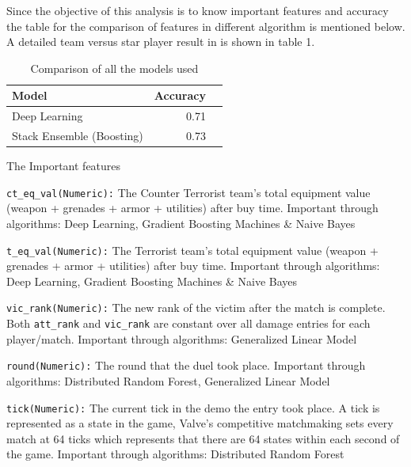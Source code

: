 \documentclass[conference]{IEEEtran}
\begin{document}
Since the objective of this analysis is to  know important features and accuracy the table for the comparison of features in different algorithm is mentioned below. 
A detailed team versus star player result in is shown in table 1.

\begin{table}[htbp]
  \centering
  \caption{Comparison of all the models used}
    \begin{tabular}{|l|r|r|}
    \toprule
    Model & \multicolumn{1}{l|}{Accuracy}  \\
    \midrule
    Deep Learning   & ~0.71 \\
    \midrule
    Stack Ensemble (Boosting)   & ~0.73 \\
    \bottomrule
    \end{tabular}%
  \label{tab:addlabel}%
\end{table}%
 
The Important features

    \item \texttt{ct\_eq\_val(Numeric):} The Counter Terrorist team's total equipment value (weapon + grenades + armor + utilities) after buy time.
        Important through algorithms: Deep Learning, Gradient Boosting Machines & Naive Bayes

     \item \texttt{t\_eq\_val(Numeric):} The Terrorist team's total equipment value (weapon + grenades + armor + utilities) after buy time.
        Important through algorithms: Deep Learning, Gradient Boosting Machines & Naive Bayes

     \item \texttt{vic\_rank(Numeric):} The new rank of the victim after the match is complete. Both \texttt{att\_rank} and \texttt{vic\_rank} are constant over all damage entries for each player/match.
        Important through algorithms: Generalized Linear Model

     \item \texttt{round(Numeric):} The round that the duel took place.
        Important through algorithms: Distributed Random Forest, Generalized Linear Model

     \item \texttt{tick(Numeric):} The current tick in the demo the entry took place. A tick is represented as a state in the game, Valve's competitive matchmaking sets every match at 64 ticks which represents that there are 64 states within each second of the game.
        Important through algorithms: Distributed Random Forest
\end{document}
